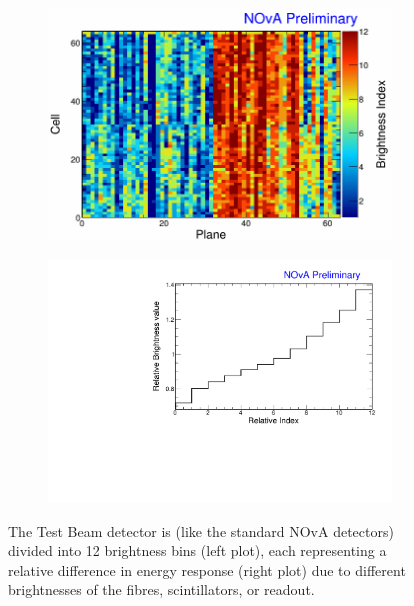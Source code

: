 \begin{figure}[hbtp]
\centering
\begin{subfigure}[b]{0.495\textwidth}
\centering
\includegraphics[width=\textwidth]{Plots/NOvAExperiment/BrightnessIndex.png}
\end{subfigure}
\begin{subfigure}[b]{0.495\textwidth}
\centering
\includegraphics[width=\textwidth]{Plots/NOvAExperiment/BrightnessIndexToValue.pdf}
\end{subfigure}
\caption[Fibre Brightness bins for the NOvA calibration]{The Test Beam detector is (like the standard NOvA detectors) divided into 12 brightness bins (left plot), each representing a relative difference in energy response (right plot) due to different brightnesses of the fibres, scintillators, or readout.}
\label{figFiberBrightnessBins}
\end{figure}

